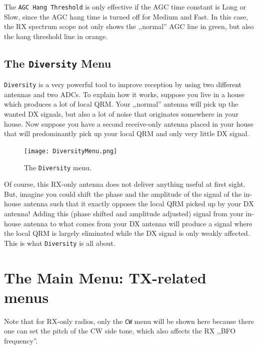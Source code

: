 \documentclass[12pt]{book}
\def\rett#1{\texttt{\color{red}#1}}
\def\bltt#1{\texttt{\color{blue}#1}}
\begin{document}
The \rett{AGC Hang Threshold} is only effective if the AGC time constant is Long or Slow,
since the AGC hang time is turned off for Medium and Fast.
In this case, the RX spectrum scope not only shows the ,,normal'' AGC line in green,
but also the hang threshold line in orange.


\section{The \texttt{Diversity} Menu}

\bltt{Diversity} is a very powerful tool to improve reception by using two different
antennas and two ADCs. To explain how it works, suppose you live in a house which produces
a lot of local QRM. Your ,,normal'' antenna will pick up the wanted DX signals, but also
a lot of noise that originates somewhere in your house. Now suppose you have a second
receive-only antenna placed in your house that will predominantly pick up your local
QRM and only very little DX signal.

\begin{figure}[ht]
\center
\texttt{[image: DiversityMenu.png]}
\caption{The \bltt{Diversity} menu.}
\label{fig:DiversityMenu}
\end{figure}

Of course, this RX-only antenna does not deliver anything useful at first sight. But, imagine
you could shift the phase and the amplitude of the signal of the in-house antenna such that it
exactly opposes the local QRM picked up by your DX antenna! Adding this (phase shifted and amplitude
adjusted) signal from your in-house antenna to what comes from your DX antenna will produce
a signal where the local QRM is largely eliminated while the DX signal is only weakly affected.
This is what \bltt{Diversity} is all about.

\chapter[TX-related menus]{The Main Menu: TX-related menus}

Note that for RX-only radios, only the \bltt{CW} menu will be shown here
because there one can set the pitch of the CW side tone, which also affects
the RX ,,BFO frequency''.
\end{document}
